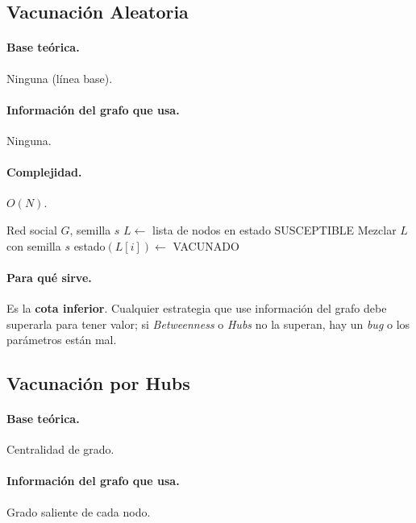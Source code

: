 \documentclass[spanish,notitlepage,letterpaper, 12pt]{article}
\begin{document}
\subsection{Vacunaci\'on Aleatoria}

\paragraph{Base te\'orica.} Ninguna (l\'inea base).

\paragraph{Informaci\'on del grafo que usa.} Ninguna.

\paragraph{Complejidad.} $O(N)$.

\begin{algorithm}[H]
\caption{Vacunaci\'on Aleatoria}
\begin{algorithmic}[1]
\Require Red social $G$, semilla $s$
\State $L \gets$ lista de nodos en estado SUSCEPTIBLE
\State Mezclar $L$ con semilla $s$
    \State estado$(L[i]) \gets$ VACUNADO
\EndFor
\end{algorithmic}
\end{algorithm}

\paragraph{Para qu\'e sirve.} Es la \textbf{cota inferior}. Cualquier estrategia que use informaci\'on del grafo debe superarla para tener valor; si \textit{Betweenness} o \textit{Hubs} no la superan, hay un \textit{bug} o los par\'ametros est\'an mal.

\subsection{Vacunaci\'on por Hubs}

\paragraph{Base te\'orica.} Centralidad de grado.

\paragraph{Informaci\'on del grafo que usa.} Grado saliente de cada nodo.
\end{document}
